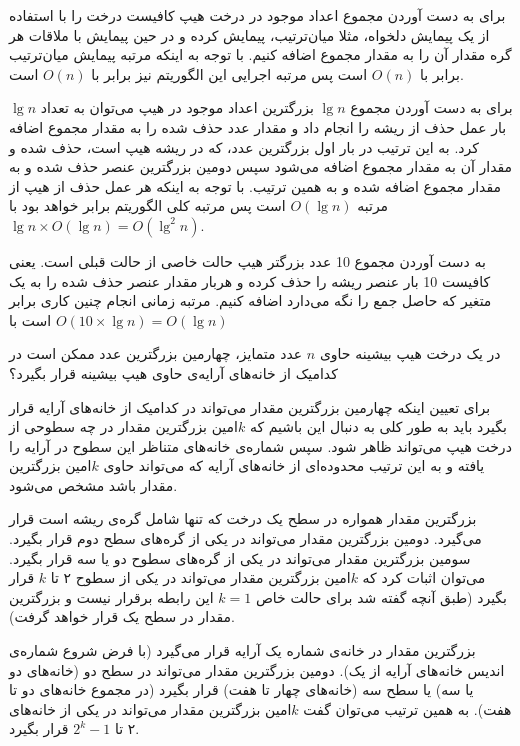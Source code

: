 
برای به دست آوردن مجموع  اعداد موجود در درخت هیپ کافیست درخت را با استفاده از یک پیمایش دلخواه، مثلا میان‌ترتیب، پیمایش کرده و در حین پیمایش با ملاقات هر گره مقدار آن را به مقدار مجموع اضافه کنیم. با توجه به اینکه مرتبه پیمایش میان‌ترتیب برابر با {$O(n)$} است پس مرتبه اجرایی این الگوریتم نیز برابر با {$O(n)$} است.

برای به دست آوردن مجموع {$\lg n$} بزرگترین اعداد موجود در هیپ می‌توان به تعداد {$\lg n$} بار عمل حذف از ریشه را انجام داد و مقدار عدد حذف شده را به مقدار مجموع اضافه کرد. به این ترتیب در بار اول بزرگترین عدد، که در ریشه هیپ است، حذف شده و مقدار آن به مقدار مجموع اضافه می‌شود سپس دومین بزرگترین عنصر حذف شده و به مقدار مجموع اضافه شده و به همین ترتیب. با توجه به اینکه هر عمل حذف از هیپ از مرتبه {$O(\lg n)$} است پس مرتبه کلی الگوریتم برابر خواهد بود با {$\lg n \times O(\lg n)=O({\lg}^2 n)$}.

به دست آوردن مجموع 10 عدد بزرگتر هیپ حالت خاصی از حالت قبلی است. یعنی کافیست 10 بار عنصر ریشه را حذف کرده و هربار مقدار عنصر حذف شده را به یک متغیر که حاصل جمع را نگه می‌دارد اضافه کنیم. مرتبه زمانی انجام چنین کاری برابر است با {$O(10 \times \lg n)=O(\lg n)$}

 در یک درخت هیپ بیشینه حاوی {$n$} عدد متمایز، چهارمین بزرگترین عدد ممکن است در کدامیک از خانه‌های آرایه‌ی حاوی هیپ بیشینه قرار بگیرد؟‌


برای تعیین اینکه چهارمین بزرگترین مقدار می‌تواند در کدامیک از خانه‌های آرایه قرار بگیرد باید به طور کلی به دنبال این باشیم که {$k$}امین بزرگترین مقدار در چه سطوحی از درخت هیپ می‌تواند ظاهر شود. سپس شماره‌ی خانه‌های متناظر این سطوح در آرایه را یافته و به این ترتیب محدوده‌ای از خانه‌های آرایه که می‌تواند حاوی {$k$}امین بزرگترین مقدار باشد مشخص می‌شود.

بزرگترین مقدار همواره در سطح یک درخت که تنها شامل گره‌ی ریشه است قرار می‌گیرد. دومین بزرگترین مقدار می‌تواند در یکی از گره‌های سطح دوم قرار بگیرد. سومین بزرگترین مقدار می‌تواند در یکی از گره‌های سطوح دو یا سه قرار بگیرد. می‌توان اثبات کرد که {$k$}امین بزرگترین مقدار می‌تواند در یکی از سطوح ۲ تا {$k$} قرار بگیرد (طبق آنچه گفته شد برای حالت خاص {$k=1$} این رابطه برقرار نیست و بزرگترین مقدار در سطح یک قرار خواهد گرفت).

بزرگترین مقدار در خانه‌ی شماره یک آرایه قرار می‌گیرد (با فرض شروع شماره‌ی اندیس خانه‌های آرایه از یک). دومین بزرگترین مقدار می‌تواند در سطح دو (خانه‌های دو یا سه) یا سطح سه (خانه‌های چهار تا هفت) قرار بگیرد (در مجموع خانه‌های دو تا هفت). به همین ترتیب می‌توان گفت {$k$}امین بزرگترین مقدار می‌تواند در یکی از خانه‌های ۲ تا {$2^k-1$} قرار بگیرد.

